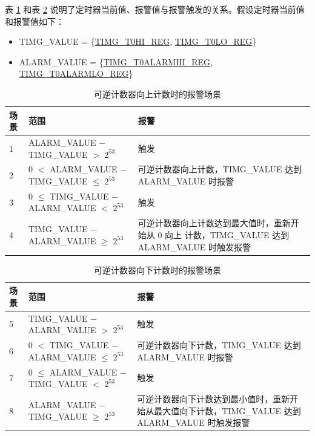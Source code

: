 \documentclass[main\_\_CN.tex]{subfiles}
\begin{document}
表 \ref{tab:timg-alarm-generation-up} 和表 \ref{tab:timg-alarm-generation-down} 说明了定时器当前值、报警值与报警触发的关系。假设定时器当前值和报警值如下：

\begin{itemize}
    \item TIMG\_VALUE = \{\hyperref[regdesc:TIMGTXHIREG]{TIMG\_T0HI\_REG}, \hyperref[regdesc:TIMGTXLOREG]{TIMG\_T0LO\_REG}\}
    \item ALARM\_VALUE = \{\hyperref[regdesc:TIMGTXALARMHIREG]{TIMG\_T0ALARMHI\_REG}, \hyperref[regdesc:TIMGTXALARMLOREG]{TIMG\_T0ALARMLO\_REG}\}
\end{itemize}


\begin{table}[H]
\centering
\caption{可逆计数器向上计数时的报警场景}
\label{tab:timg-alarm-generation-up}

\begin{tabular}{|l|l|m{7cm}|}
\hline
\rowcolor{lightgray}
    \textbf{场景} & \textbf{范围} & \textbf{报警} \\\hline
     1 & ALARM\_VALUE $-$ TIMG\_VALUE $>$ $2^{53}$ & 触发 \\\hline
     2 & 0 $<$ ALARM\_VALUE $-$ TIMG\_VALUE $\leq$ $2^{53}$ & 可逆计数器向上计数，TIMG\_VALUE 达到 ALARM\_VALUE 时报警 \\\hline
     3 & 0 $\leq$ TIMG\_VALUE $-$ ALARM\_VALUE $<$ $2^{53}$ & 触发 \\\hline
     4 & TIMG\_VALUE $-$ ALARM\_VALUE $\geq$ $2^{53}$ & 可逆计数器向上计数达到最大值时，重新开始从 0 向上 计数，TIMG\_VALUE 达到 ALARM\_VALUE 时触发报警\\\hline

\end{tabular}
\end{table}

\begin{table}[H]
\centering
\caption{可逆计数器向下计数时的报警场景}
\label{tab:timg-alarm-generation-down}

\begin{tabular}{|l|l|m{7cm}|}
\hline
\rowcolor{lightgray}
    \textbf{场景} & \textbf{范围} & \textbf{报警} \\\hline
     5 & TIMG\_VALUE $-$ ALARM\_VALUE  $>$ $2^{53}$ & 触发 \\\hline
     6 &  0 $<$ TIMG\_VALUE $-$ ALARM\_VALUE $\leq$ $2^{53}$ & 可逆计数器向下计数，TIMG\_VALUE 达到 ALARM\_VALUE 时报警 \\\hline
     7 & 0 $\leq$ ALARM\_VALUE $-$ TIMG\_VALUE $<$ $2^{53}$ & 触发 \\\hline
     8 & ALARM\_VALUE $-$ TIMG\_VALUE $\geq$ $2^{53}$ & 可逆计数器向下计数达到最小值时，重新开始从最大值向下计数，TIMG\_VALUE 达到 ALARM\_VALUE 时触发报警 \\\hline

\end{tabular}
\end{table}
\end{document}
